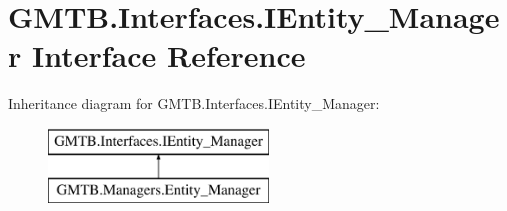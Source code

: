 \hypertarget{interface_g_m_t_b_1_1_interfaces_1_1_i_entity___manager}{}\section{G\+M\+T\+B.\+Interfaces.\+I\+Entity\+\_\+\+Manager Interface Reference}
\label{interface_g_m_t_b_1_1_interfaces_1_1_i_entity___manager}
Inheritance diagram for G\+M\+T\+B.\+Interfaces.\+I\+Entity\+\_\+\+Manager\+:\begin{figure}[H]
\begin{center}
\leavevmode
\includegraphics[height=2.000000cm]{interface_g_m_t_b_1_1_interfaces_1_1_i_entity___manager}
\end{center}
\end{figure}
